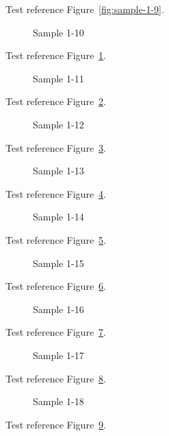 Test reference Figure~\ref{fig:sample-1-9}.

\begin{figure}[tbhp]
\caption{Sample 1-10}
\label{fig:sample-1-10}
\end{figure}

Test reference Figure~\ref{fig:sample-1-10}.

\begin{figure}[tbhp]
\caption{Sample 1-11}
\label{fig:sample-1-11}
\end{figure}

Test reference Figure~\ref{fig:sample-1-11}.

\begin{figure}[tbhp]
\caption{Sample 1-12}
\label{fig:sample-1-12}
\end{figure}

Test reference Figure~\ref{fig:sample-1-12}.

\begin{figure}[tbhp]
\caption{Sample 1-13}
\label{fig:sample-1-13}
\end{figure}

Test reference Figure~\ref{fig:sample-1-13}.

\begin{figure}[tbhp]
\caption{Sample 1-14}
\label{fig:sample-1-14}
\end{figure}

Test reference Figure~\ref{fig:sample-1-14}.

\begin{figure}[tbhp]
\caption{Sample 1-15}
\label{fig:sample-1-15}
\end{figure}

Test reference Figure~\ref{fig:sample-1-15}.

\begin{figure}[tbhp]
\caption{Sample 1-16}
\label{fig:sample-1-16}
\end{figure}

Test reference Figure~\ref{fig:sample-1-16}.

\begin{figure}[tbhp]
\caption{Sample 1-17}
\label{fig:sample-1-17}
\end{figure}

Test reference Figure~\ref{fig:sample-1-17}.

\begin{figure}[tbhp]
\caption{Sample 1-18}
\label{fig:sample-1-18}
\end{figure}

Test reference Figure~\ref{fig:sample-1-18}.

